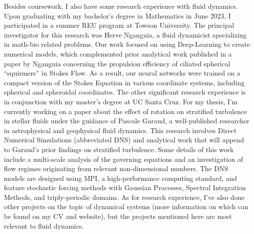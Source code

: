 \documentclass{article}
\begin{document}
Besides coursework, I also have some research experience with fluid dynamics. Upon graduating with my bachelor's degree in Mathematics in June 2023, I participated in a summer REU program at Towson University. The principal investigator for this research was Herve Nganguia, a fluid dynamicist specializing in math-bio related problems. Our work focused on using Deep-Learning to create numerical models, which complemented prior analytical work published in a paper by Nganguia concerning the propulsion efficiency of ciliated spherical ``squirmers'' in Stokes Flow. As a result, our neural networks were trained on a compact version of the Stokes Equation in various coordinate systems, including spherical and spheroidal coordinates. The other significant research experience is in conjunction with my master's degree at UC Santa Cruz. For my thesis, I'm currently working on a paper about the effect of rotation on stratified turbulence in stellar fluids under the guidance of Pascale Garaud, a well-published researcher in astrophysical and geophysical fluid dynamics. This research involves Direct Numerical Simulations (abbreviated DNS) and analytical work that will append to Garaud's prior findings on stratified turbulence. Some details of this work include a multi-scale analysis of the governing equations and an investigation of flow regimes originating from relevant non-dimensional numbers. The DNS models are designed using MPI, a high-performance computing standard, and feature stochastic forcing methods with Gaussian Processes, Spectral Integration Methods, and triply-periodic domains. As for research experience, I've also done other projects on the topic of dynamical systems (more information on which can be found on my CV and website), but the projects mentioned here are most relevant to fluid dynamics.

\end{document}
